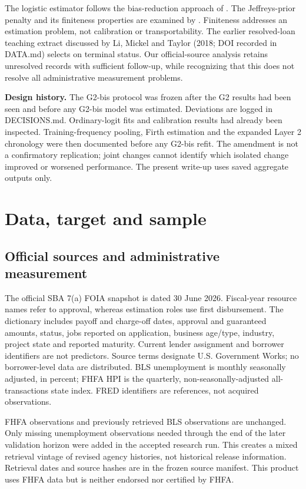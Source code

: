 The logistic estimator follows the bias-reduction approach of \citet{firth1993}. The Jeffreys-prior penalty and its finiteness properties are examined by \citet{kosmidis2021}. Finiteness addresses an estimation problem, not calibration or transportability. The earlier resolved-loan teaching extract discussed by Li, Mickel and Taylor (2018; DOI recorded in DATA.md) selects on terminal status. Our official-source analysis retains unresolved records with sufficient follow-up, while recognizing that this does not resolve all administrative measurement problems.

\textbf{Design history.} The G2-bis protocol was frozen after the G2 results had been seen and before any G2-bis model was estimated. Deviations are logged in DECISIONS.md. Ordinary-logit fits and calibration results had already been inspected. Training-frequency pooling, Firth estimation and the expanded Layer 2 chronology were then documented before any G2-bis refit. The amendment is not a confirmatory replication; joint changes cannot identify which isolated change improved or worsened performance. The present write-up uses saved aggregate outputs only.

\section{Data, target and sample}
\subsection{Official sources and administrative measurement}
The official SBA 7(a) FOIA snapshot is dated 30 June 2026. Fiscal-year resource names refer to approval, whereas estimation roles use first disbursement. The dictionary includes payoff and charge-off dates, approval and guaranteed amounts, status, jobs reported on application, business age/type, industry, project state and reported maturity. Current lender assignment and borrower identifiers are not predictors. Source terms designate U.S. Government Works; no borrower-level data are distributed. BLS unemployment is monthly seasonally adjusted, in percent; FHFA HPI is the quarterly, non-seasonally-adjusted all-transactions state index. FRED identifiers are references, not acquired observations.

FHFA observations and previously retrieved BLS observations are unchanged. Only missing unemployment observations needed through the end of the later validation horizon were added in the accepted research run. This creates a mixed retrieval vintage of revised agency histories, not historical release information. Retrieval dates and source hashes are in the frozen source manifest. This product uses FHFA data but is neither endorsed nor certified by FHFA.

